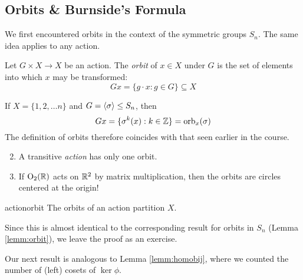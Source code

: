 \clearpage



\subsection{Orbits \& Burnside's Formula}

We first encountered orbits in the context of the symmetric groups $S_n$. The same idea applies to any action.

\begin{defn}{}{}
	Let $G\times X\to X$ be an action. The \emph{orbit} of $x\in X$ under $G$ is the set of elements into which $x$ may be transformed:
	\[
		Gx=\{g\cdot x:g\in G\}\subseteq X
	\]
\end{defn}


\begin{examples}{}{}
	\exstart If $X=\{1,2,\ldots n\}$ and $G=\left\langle \sigma\right\rangle\le S_n$, then
	\[
		Gx=\{\sigma^k(x):k\in\mathbb{Z}\}=\mathrm{orb}_x(\sigma)
	\]
	The definition of orbits therefore coincides with that seen earlier in the course.
	\begin{enumerate}\setcounter{enumi}{1}
	  \item A transitive \emph{action\footnotemark} has only one orbit.
	  
	  \item If $\mathrm{O}_2(\mathbb{R})$ acts on $\mathbb{R}^2$ by matrix multiplication, then the orbits are circles centered at the origin!
	\end{enumerate}
\end{examples}



\begin{lemm}{}{actionorbit}
	The orbits of an action partition $X$.
\end{lemm}

Since this is almost identical to the corresponding result for orbits in $S_n$ (Lemma \ref{lemm:orbit}), we leave the proof as an exercise.\smallbreak

Our next result is analogous to Lemma \ref{lemm:homobij}, where we counted the number of (left) cosets of $\ker\phi$.




